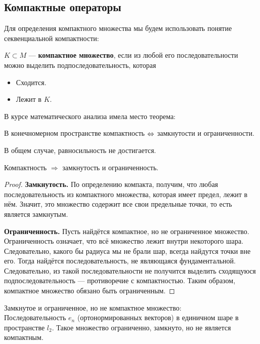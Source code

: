 \documentclass[12pt]{article}
\begin{document}
	\subsection{Компактные операторы}
	
	Для определения компактного множества мы будем использовать понятие секвенциальной компактности:
	\begin{defi}
		$K \subset M$ --- \textbf{компактное множество}, если из любой его последовательности можно выделить подпоследовательность,
		которая
		\begin{itemize}
			\item Сходится.
			\item Лежит в $K$.
		\end{itemize}
	\end{defi}
	
	В курсе математического анализа имела место теорема:
	
	\begin{theorem}
		В конечномерном пространстве компактность $\Leftrightarrow$ замкнутости и ограниченности.
	\end{theorem}
	
	В общем случае, равносильность не достигается.
	
	\begin{theorem}
		Компактность $\Rightarrow$ замкнутость и ограниченность.
	\end{theorem}
	\begin{proof}
		\textbf{Замкнутость.} По определению компакта, получим, что любая последовательность из 
		компактного множества, которая имеет предел, лежит в нём. Значит, это множество содержит все свои предельные точки, то есть 
		является замкнутым.
		
		\textbf{Ограниченность.} Пусть найдётся компактное, но не ограниченное множество. Ограниченность означает, что всё множество
		лежит внутри некоторого шара. Следовательно, какого бы радиуса мы не брали шар, всегда найдутся точки вне его. Тогда
		найдётся последовательность, не являющаяся фундаментальной. Следовательно, из такой последовательности не получится выделить
		сходящуюся подпоследовательность --- противоречие с компактностью. Таким образом, компактное множество обязано быть ограниченным.
	\end{proof}
	
	\example Замкнутое и ограниченное, но не компактное множество: \\
	Последовательность $e_n$ (ортонормированных векторов) в единичном шаре в пространстве $l_2$. Такое множество ограниченно, 
	замкнуто, но не является компактным.
	
\end{document}
